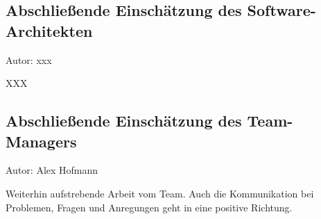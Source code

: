 \subsection{Abschließende Einschätzung des Software-Architekten}
{\small Autor: xxx}

XXX

\subsection{Abschließende Einschätzung des Team-Managers}
{\small Autor: Alex Hofmann}

Weiterhin aufstrebende Arbeit vom Team. Auch die Kommunikation bei Problemen, Fragen und Anregungen geht in eine positive Richtung.

